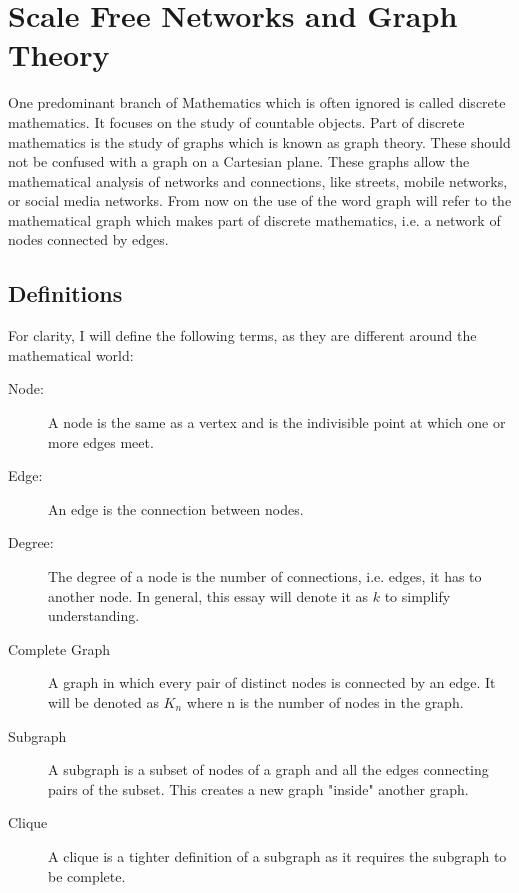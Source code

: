 \documentclass[12pt, a4paper]{article}   %
\begin{document}
\section{Scale Free Networks and Graph Theory}

One predominant branch of Mathematics which is often ignored is called discrete mathematics. It focuses on the study of countable objects. Part of discrete mathematics is the study of graphs which is known as graph theory. These should not be confused with a graph on a Cartesian plane. These graphs allow the mathematical analysis of networks and connections, like streets, mobile networks, or social media networks. From now on the use of the word graph will refer to the mathematical graph which makes part of discrete mathematics, i.e. a network of nodes connected by edges.

\subsection{Definitions}

For clarity, I will define the following terms, as they are different around the mathematical world:
\begin{description}
    \item[Node:] A node is the same as a vertex and is the indivisible point at which one or more edges meet. \autocite{VertexGraphTheory2026}
    \item[Edge:] An edge is the connection between nodes. \autocite{GlossaryGraphTheory2026}
    \item[Degree:] The degree of a node is the number of connections, i.e. edges, it has to another node. In general, this essay will denote it as \( k \) to simplify understanding. \autocite{GlossaryGraphTheory2026}
    \item[Complete Graph]  A graph in which every pair of distinct nodes is connected by an edge. It will be denoted as \( K_n \) where n is the number of nodes in the graph. \autocite{DegreeGraphTheory2026}
    \item[Subgraph] A subgraph is a subset of nodes of a graph and all the edges connecting pairs of the subset. This creates a new graph "inside" another graph.\autocite{GlossaryGraphTheory2026}
    \item[Clique] A clique is a tighter definition of a subgraph as it requires the subgraph to be complete. \autocite{CliqueGraphTheory2025}
\end{description}
\end{document}
